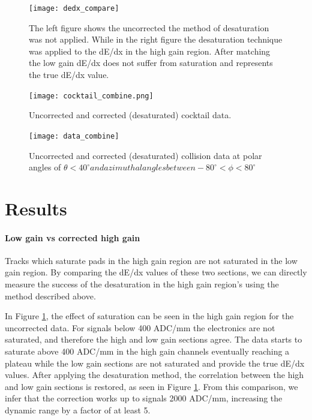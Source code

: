 \documentclass[review]{elsarticle}
\begin{document}
\begin{figure}[t]
\centering
\texttt{[image: dedx\_compare]}
\caption{The left figure shows the uncorrected the method of desaturation was not applied. While in the right figure the desaturation technique was applied to the dE/dx in the high gain region. After matching the low gain dE/dx does not suffer from saturation and represents the true dE/dx value.}
\label{fig:lowvshigh}
\end{figure}

\begin{figure}[t]
\texttt{[image: cocktail\_combine.png]}
\caption{Uncorrected and corrected (desaturated) cocktail data.}
\label{fig:cocktail_combine}
\end{figure}

\begin{figure}[t]
\texttt{[image: data\_combine]}
\caption{Uncorrected and corrected (desaturated) collision data at polar angles of $\theta < 40^{\circ} and azimuthal angles between -80^{\circ} < \phi < 80^{\circ}$}
\label{fig:data_combine}
\end{figure}

\section{Results}
\paragraph{Low gain vs corrected high gain}

Tracks which saturate pads in the high gain region are not saturated in the low gain region. By comparing the dE/dx values of these two sections, we can directly measure the success of the desaturation in the high gain region's using the method described above.  
 
In Figure \ref{fig:lowvshigh}, the effect of saturation can be seen in the high gain region for the uncorrected data. For signals below 400 ADC/mm the electronics are not saturated, and therefore the high and low gain sections agree. The data starts to saturate above 400 ADC/mm in the high gain channels eventually reaching a plateau while the low gain sections are not saturated and provide the true dE/dx values.
 After applying the desaturation method, the correlation between the high and low gain sections is restored, as seen in Figure \ref{fig:lowvshigh}. From this comparison, we infer that the correction works up to signals 2000 ADC/mm, increasing the dynamic range by a factor of at least 5.
\end{document}
